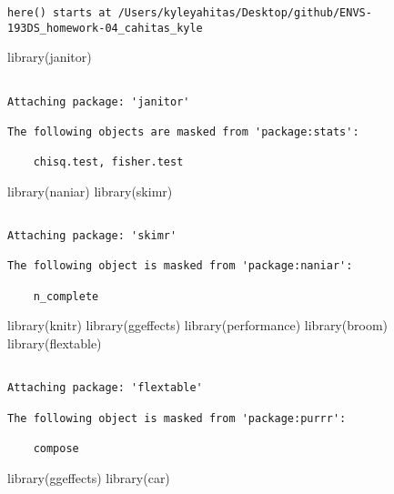 \documentclass[
  letterpaper,
  DIV=11,
  numbers=noendperiod]{scrartcl}
\newenvironment{Shaded}{\begin{snugshade}}{\end{snugshade}}
\newcommand{\FunctionTok}[1]{\textcolor[rgb]{0.28,0.35,0.67}{#1}}
\newcommand{\NormalTok}[1]{\textcolor[rgb]{0.00,0.23,0.31}{#1}}
\begin{document}
\begin{verbatim}
here() starts at /Users/kyleyahitas/Desktop/github/ENVS-193DS_homework-04_cahitas_kyle
\end{verbatim}

\begin{Shaded}
\begin{Highlighting}[]
\FunctionTok{library}\NormalTok{(janitor)}
\end{Highlighting}
\end{Shaded}

\begin{verbatim}

Attaching package: 'janitor'

The following objects are masked from 'package:stats':

    chisq.test, fisher.test
\end{verbatim}

\begin{Shaded}
\begin{Highlighting}[]
\FunctionTok{library}\NormalTok{(naniar)}
\FunctionTok{library}\NormalTok{(skimr)}
\end{Highlighting}
\end{Shaded}

\begin{verbatim}

Attaching package: 'skimr'

The following object is masked from 'package:naniar':

    n_complete
\end{verbatim}

\begin{Shaded}
\begin{Highlighting}[]
\FunctionTok{library}\NormalTok{(knitr)}
\FunctionTok{library}\NormalTok{(ggeffects)}
\FunctionTok{library}\NormalTok{(performance)}
\FunctionTok{library}\NormalTok{(broom)}
\FunctionTok{library}\NormalTok{(flextable)}
\end{Highlighting}
\end{Shaded}

\begin{verbatim}

Attaching package: 'flextable'

The following object is masked from 'package:purrr':

    compose
\end{verbatim}

\begin{Shaded}
\begin{Highlighting}[]
\FunctionTok{library}\NormalTok{(ggeffects)}
\FunctionTok{library}\NormalTok{(car)}
\end{Highlighting}
\end{Shaded}
\end{document}
